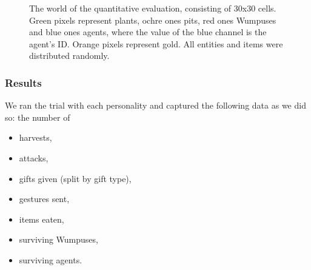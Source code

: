 \begin{figure}
	\centering
	\caption{The world of the quantitative evaluation, consisting of 30x30 cells. Green pixels represent plants, ochre ones pits, red ones Wumpuses and blue ones agents, where the value of the blue channel is the agent's ID. Orange pixels represent gold. All entities and items were distributed randomly.}
	\label{fig:evalWorldQuant}
\end{figure}

\subsubsection{Results}

We ran the trial with each personality and captured the following data as we did so: the number of

\begin{itemize}
	\item harvests,
	\item attacks,
	\item gifts given (split by gift type),
	\item gestures sent,
	\item items eaten,
	\item surviving Wumpuses,
	\item surviving agents.
\end{itemize}

